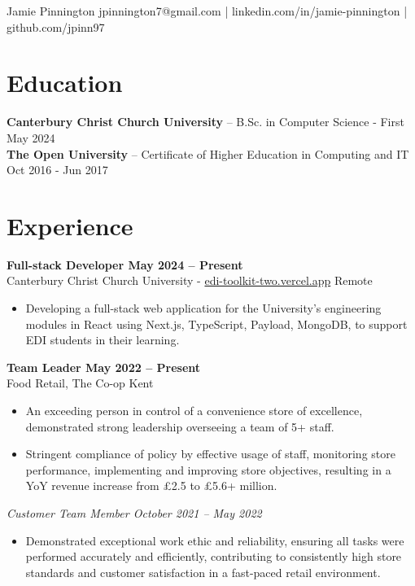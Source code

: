 \documentclass[11pt,letterpaper]{article}
\begin{document}
\centering
{\Huge Jamie Pinnington}
\vspace{6pt}
jpinnington7@gmail.com | linkedin.com/in/jamie-pinnington | github.com/jpinn97

\section*{Education}
\textbf{Canterbury Christ Church University} -- B.Sc. in Computer Science - First \hfill May 2024 \\
\textbf{The Open University} -- Certificate of Higher Education in Computing and IT \hfill Oct 2016 - Jun 2017

\vspace{-4.5pt}

\section*{Experience}

\textbf{Full-stack Developer \hfill May 2024 -- Present}\\
Canterbury Christ Church University - \href{https://edi-toolkit-two.vercel.app}{edi-toolkit-two.vercel.app} \hfill Remote \\
\vspace{-10pt}
\begin{itemize}
  \item Developing a full-stack web application for the University's engineering modules in React using Next.js, TypeScript, Payload, MongoDB, to support EDI students in their learning.
\end{itemize}

\textbf{Team Leader \hfill May 2022 -- Present}\\
Food Retail, The Co-op \hfill Kent \\
\vspace{-10pt}
\begin{itemize}
  \item An exceeding person in control of a convenience store of excellence, demonstrated strong leadership overseeing a team of 5+ staff.
  \item Stringent compliance of policy by effective usage of staff, monitoring store performance, implementing and improving store objectives, resulting in a YoY revenue increase from £2.5 to £5.6+ million.
\end{itemize}

\textit{Customer Team Member \hfill October 2021 -- May 2022}\\
\vspace{-10pt}
\begin{itemize}
  \item Demonstrated exceptional work ethic and reliability, ensuring all tasks were performed accurately and efficiently, contributing to consistently high store standards and customer satisfaction in a fast-paced retail environment.
\end{itemize}
\end{document}

